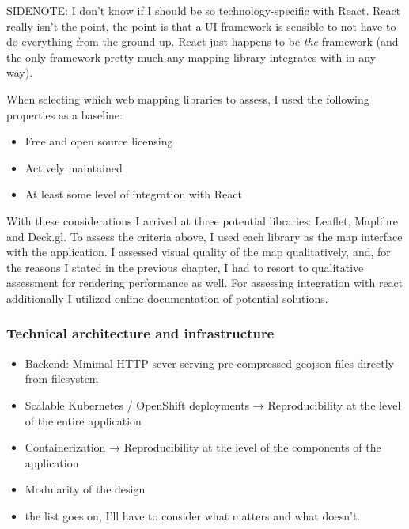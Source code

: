 SIDENOTE: I don't know if I should be so technology-specific with React.
React really isn't the point, the point is that a UI framework is sensible
to not have to do everything from the ground up. React just happens to
be \textit{the} framework
(and the only framework pretty much any mapping library integrates with in any way).

When selecting which web mapping libraries to assess, I used the following properties as a baseline:
\begin{itemize}
	\item Free and open source licensing
	\item Actively maintained
	\item At least some level of integration with React
\end{itemize}

With these considerations I arrived at three potential libraries:
Leaflet, Maplibre and Deck.gl.
To assess the criteria above,
I used each library as the map interface with the application.
I assessed visual quality of the map qualitatively, and, for the reasons I stated in the previous chapter,
I had to resort to qualitative assessment for rendering performance as well.
For assessing integration with react additionally I utilized online documentation of potential solutions.



\subsubsection{Technical architecture and infrastructure}

\begin{itemize}
	\item Backend: Minimal HTTP sever serving pre-compressed geojson files directly from filesystem
	\item Scalable Kubernetes / OpenShift deployments → Reproducibility at the level of the entire application
	\item Containerization → Reproducibility at the level of the components of the application
	\item Modularity of the design
	\item the list goes on, I'll have to consider what matters and what doesn't.
\end{itemize}

